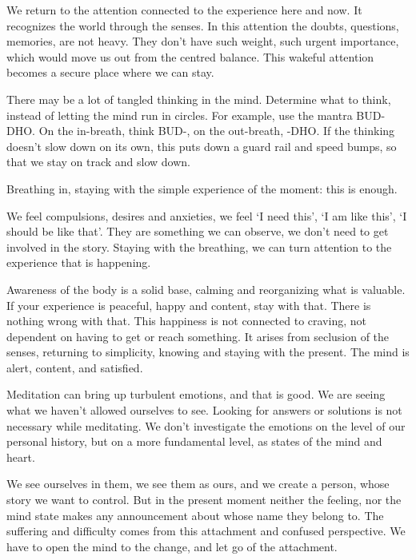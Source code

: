 We return to the attention connected to the experience here and now. It
recognizes the world through the senses. In this attention the doubts,
questions, memories, are not heavy. They don't have such weight, such
urgent importance, which would move us out from the centred balance.
This wakeful attention becomes a secure place where we can stay.

There may be a lot of tangled thinking in the mind. Determine what to
think, instead of letting the mind run in circles. For example, use the
mantra BUD-DHO. On the in-breath, think BUD-, on the out-breath, -DHO.
If the thinking doesn't slow down on its own, this puts down a guard
rail and speed bumps, so that we stay on track and slow down.


Breathing in, staying with the simple experience of the moment: this is
enough.

We feel compulsions, desires and anxieties, we feel `I need this', `I am
like this', `I should be like that'. They are something we can observe,
we don't need to get involved in the story. Staying with the breathing,
we can turn attention to the experience that is happening.

Awareness of the body is a solid base, calming and reorganizing what is
valuable. If your experience is peaceful, happy and content, stay with
that. There is nothing wrong with that. This happiness is not connected
to craving, not dependent on having to get or reach something. It arises
from seclusion of the senses, returning to simplicity, knowing and
staying with the present. The mind is alert, content, and satisfied.

Meditation can bring up turbulent emotions, and that is good. We are
seeing what we haven't allowed ourselves to see. Looking for answers or
solutions is not necessary while meditating. We don't investigate the
emotions on the level of our personal history, but on a more fundamental
level, as states of the mind and heart.

We see ourselves in them, we see them as ours, and we create a person,
whose story we want to control. But in the present moment neither the
feeling, nor the mind state makes any announcement about whose name they
belong to. The suffering and difficulty comes from this attachment and
confused perspective. We have to open the mind to the change, and let go
of the attachment.


